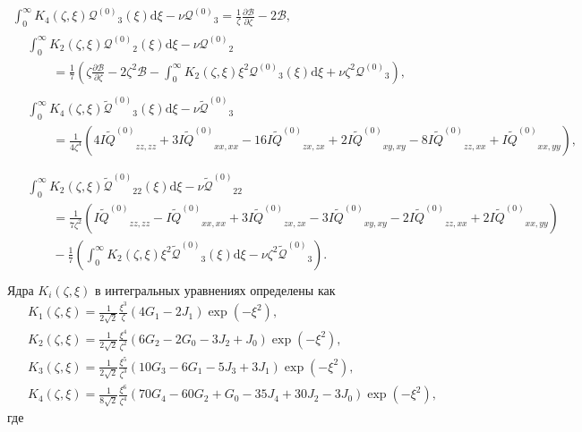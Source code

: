 \documentclass[a4paper,12pt]{article}
\newcommand{\dd}{\mathrm{d}}
\newcommand{\pder}[2][]{\frac{\partial#1}{\partial#2}}
\newcommand{\Q}{\ensuremath{\mathcal{Q}^{(0)}}}
\newcommand{\QQ}{\ensuremath{\tilde{\mathcal{Q}}^{(0)}}}
\newcommand{\IFF}[1]{\ensuremath{I\tilde{#1}^{(0)}}}
\begin{document}
\begin{gather}
    \int_0^\infty K_4(\zeta,\xi)\Q_3(\xi)\dd\xi - \nu\Q_3
        = \frac1\zeta\pder[\mathcal{B}]{\zeta} - 2\mathcal{B}, \\
    \begin{aligned}
    &\int_0^\infty K_2(\zeta,\xi)\Q_2(\xi)\dd\xi - \nu\Q_2 \\
        &\qquad = \frac17\left( \zeta\pder[\mathcal{B}]{\zeta} - 2\zeta^2\mathcal{B}
        - \int_0^\infty K_2(\zeta,\xi)\xi^2\Q_3(\xi)\dd\xi
        + \nu\zeta^2\Q_3 \right),
    \end{aligned}\\
    \begin{aligned}
    &\int_0^\infty K_4(\zeta,\xi)\QQ_3(\xi)\dd\xi - \nu\QQ_3 \\
        &\qquad = \frac1{4\zeta^4}\left( 4\IFF{Q}_{zz,zz} + 3\IFF{Q}_{xx,xx} - 16\IFF{Q}_{zx,zx} + 2\IFF{Q}_{xy,xy} - 8\IFF{Q}_{zz,xx} + \IFF{Q}_{xx,yy} \right), \\
    \end{aligned}\\
    \begin{aligned}
    &\int_0^\infty K_2(\zeta,\xi)\QQ_{22}(\xi)\dd\xi - \nu\QQ_{22} \\
        &\qquad = \frac1{7\zeta^2}\left(
        \IFF{Q}_{zz,zz} - \IFF{Q}_{xx,xx} + 3\IFF{Q}_{zx,zx} - 3\IFF{Q}_{xy,xy} - 2\IFF{Q}_{zz,xx} + 2\IFF{Q}_{xx,yy} \right)\\
        &\qquad - \frac17\left(\int_0^\infty K_2(\zeta,\xi)\xi^2\QQ_3(\xi)\dd\xi
        - \nu\zeta^2\QQ_3 \right).
    \end{aligned}\\
\end{gather}
Ядра \(K_i(\zeta,\xi)\) в интегральных уравнениях определены как
\begin{gather}
    K_1(\zeta,\xi) = \frac1{2\sqrt2}\frac{\xi^3}{\zeta}\left(4G_1-2J_1\right)\exp\left(-\xi^2\right), \\
    K_2(\zeta,\xi) = \frac1{2\sqrt2}\frac{\xi^4}{\zeta^2}\left(6G_2-2G_0-3J_2+J_0\right)\exp\left(-\xi^2\right), \\
    K_3(\zeta,\xi) = \frac1{2\sqrt2}\frac{\xi^5}{\zeta^3}\left(10G_3-6G_1-5J_3+3J_1\right)\exp\left(-\xi^2\right), \\
    K_4(\zeta,\xi) = \frac1{8\sqrt2}\frac{\xi^6}{\zeta^4}\left(70G_4-60G_2+G_0-35J_4+30J_2-3J_0\right)\exp\left(-\xi^2\right),
\end{gather}
где
\end{document}
